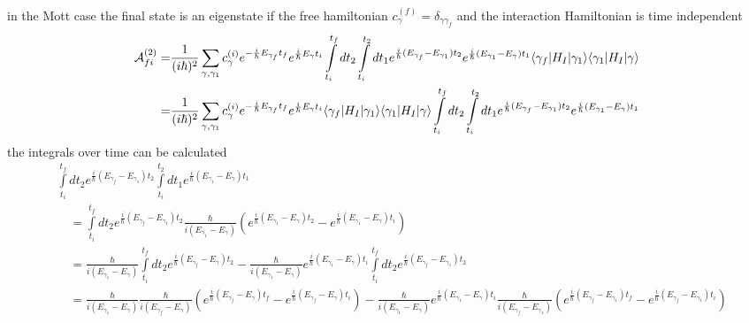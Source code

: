 in the Mott case the final state is an eigenstate if the free hamiltonian $c_{\gamma}^{(f)}=\delta_{\gamma\gamma_f}$ and the interaction Hamiltonian is time independent
\begin{align}
    {\cal A}_{fi}^{(2)} = & \frac{1}{(i\hbar)^2} \sum\limits_{\gamma,\gamma_1}c_{\gamma}^{(i)}e^{-\frac{i}{\hbar}E_{\gamma_f} t_f}e^{\frac{i}{\hbar}E_{\gamma} t_i}\int\limits_{t_i}^{t_f}dt_2\int\limits_{t_i}^{t_2}dt_1e^{\frac{i}{\hbar}(E_{\gamma_f}-E_{\gamma_1})t_2}e^{\frac{i}{\hbar}(E_{\gamma_1}-E_{\gamma})t_1}\langle \gamma_f |H_I| \gamma_1\rangle\langle \gamma_1 |H_I| \gamma\rangle\nonumber     \\
    =                     & \frac{1}{(i\hbar)^2} \sum\limits_{\gamma,\gamma_1}c_{\gamma}^{(i)}e^{-\frac{i}{\hbar}E_{\gamma_f} t_f}e^{\frac{i}{\hbar}E_{\gamma} t_i}\langle \gamma_f |H_I| \gamma_1\rangle\langle \gamma_1 |H_I| \gamma\rangle\int\limits_{t_i}^{t_f}dt_2\int\limits_{t_i}^{t_2}dt_1e^{\frac{i}{\hbar}(E_{\gamma_f}-E_{\gamma_1})t_2}e^{\frac{i}{\hbar}(E_{\gamma_1}-E_{\gamma})t_1}\label{eq:gen-second-order-intermediate}
\end{align}
the integrals over time can be calculated
\begin{align}
    & \int\limits_{t_i}^{t_f}dt_2e^{\frac{i}{\hbar}(E_{\gamma_f}-E_{\gamma_1})t_2}\int\limits_{t_i}^{t_2}dt_1e^{\frac{i}{\hbar}(E_{\gamma_1}-E_{\gamma})t_1}\nonumber                                                                                                                                                                                                                                                                                                \\
    & \quad =\int\limits_{t_i}^{t_f}dt_2e^{\frac{i}{\hbar}(E_{\gamma_f}-E_{\gamma_1})t_2}\frac{\hbar}{i(E_{\gamma_1}-E_{\gamma})}\left(e^{\frac{i}{\hbar}(E_{\gamma_1}-E_{\gamma})t_2}-e^{\frac{i}{\hbar}(E_{\gamma_1}-E_{\gamma})t_i}\right)\nonumber                                                                                                                                                                                                               \\
    & \quad =\frac{\hbar}{i(E_{\gamma_1}-E_{\gamma})}\int\limits_{t_i}^{t_f}dt_2 e^{\frac{i}{\hbar}(E_{\gamma_f}-E_{\gamma})t_2}-\frac{\hbar}{i(E_{\gamma_1}-E_{\gamma})}e^{\frac{i}{\hbar}(E_{\gamma_1}-E_{\gamma})t_i}\int\limits_{t_i}^{t_f}dt_2e^{\frac{i}{\hbar}(E_{\gamma_f}-E_{\gamma_1})t_2}\nonumber                                                                                                                                                        \\
    & \quad =\frac{\hbar}{i(E_{\gamma_1}-E_{\gamma})}\frac{\hbar}{i(E_{\gamma_f}-E_{\gamma})}\left(e^{\frac{i}{\hbar}(E_{\gamma_f}-E_{\gamma})t_f}-e^{\frac{i}{\hbar}(E_{\gamma_f}-E_{\gamma})t_i}\right)-\frac{\hbar}{i(E_{\gamma_1}-E_{\gamma})}e^{\frac{i}{\hbar}(E_{\gamma_1}-E_{\gamma})t_i}\frac{\hbar}{i(E_{\gamma_f}-E_{\gamma_1})}\left(e^{\frac{i}{\hbar}(E_{\gamma_f}-E_{\gamma_1})t_f}-e^{\frac{i}{\hbar}(E_{\gamma_f}-E_{\gamma_1})t_i}\right)\nonumber \\
\end{align}
